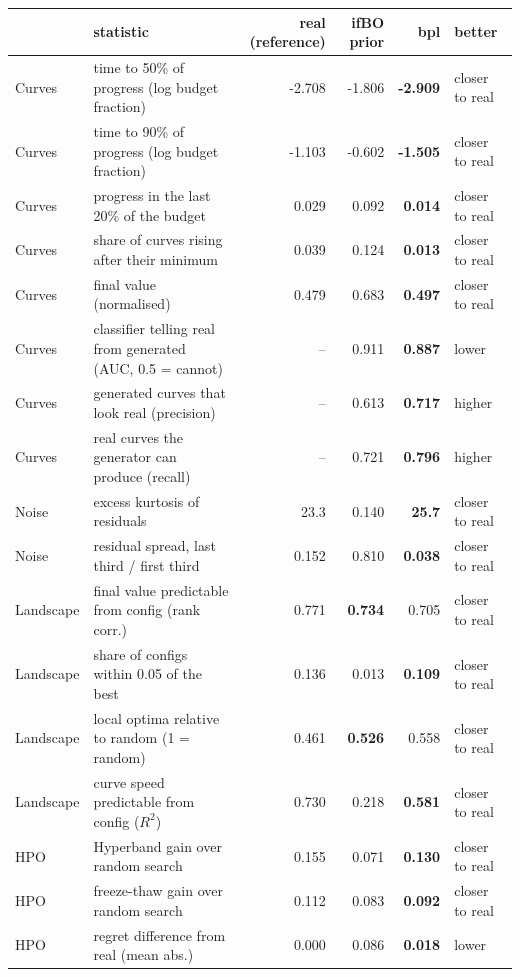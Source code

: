\begin{tabular}{llrrrl}
\toprule
 & statistic & \textbf{real (reference)} & ifBO prior & bpl & better \\
\midrule
Curves & time to 50\% of progress (log budget fraction) & -2.708 & -1.806 & \textbf{-2.909} & closer to real \\
Curves & time to 90\% of progress (log budget fraction) & -1.103 & -0.602 & \textbf{-1.505} & closer to real \\
Curves & progress in the last 20\% of the budget & 0.029 & 0.092 & \textbf{0.014} & closer to real \\
Curves & share of curves rising after their minimum & 0.039 & 0.124 & \textbf{0.013} & closer to real \\
Curves & final value (normalised) & 0.479 & 0.683 & \textbf{0.497} & closer to real \\
Curves & classifier telling real from generated (AUC, 0.5 = cannot) & -- & 0.911 & \textbf{0.887} & lower \\
Curves & generated curves that look real (precision) & -- & 0.613 & \textbf{0.717} & higher \\
Curves & real curves the generator can produce (recall) & -- & 0.721 & \textbf{0.796} & higher \\
\midrule
Noise & excess kurtosis of residuals & 23.3 & 0.140 & \textbf{25.7} & closer to real \\
Noise & residual spread, last third / first third & 0.152 & 0.810 & \textbf{0.038} & closer to real \\
\midrule
Landscape & final value predictable from config (rank corr.) & 0.771 & \textbf{0.734} & 0.705 & closer to real \\
Landscape & share of configs within 0.05 of the best & 0.136 & 0.013 & \textbf{0.109} & closer to real \\
Landscape & local optima relative to random (1 = random) & 0.461 & \textbf{0.526} & 0.558 & closer to real \\
Landscape & curve speed predictable from config ($R^2$) & 0.730 & 0.218 & \textbf{0.581} & closer to real \\
\midrule
HPO & Hyperband gain over random search & 0.155 & 0.071 & \textbf{0.130} & closer to real \\
HPO & freeze-thaw gain over random search & 0.112 & 0.083 & \textbf{0.092} & closer to real \\
HPO & regret difference from real (mean abs.) & 0.000 & 0.086 & \textbf{0.018} & lower \\
\bottomrule
\end{tabular}

